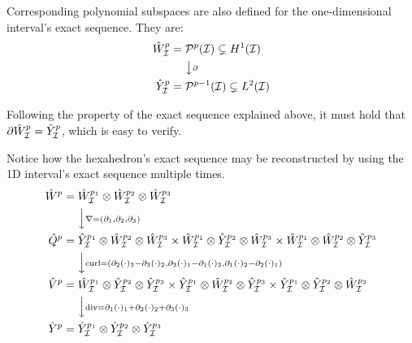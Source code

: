
Corresponding polynomial subspaces are also defined for the one-dimensional interval's exact sequence. They are:
% 
\begin{align*}
    \hat{W}^{p}_{\mathcal{I}}&=\mathcal{P}^p(\mathcal{I})\subsetneq H^1(\mathcal{I})\\
    \ &\ \ \ \ \big\downarrow  \scriptstyle{\partial}\\
    \hat{Y}^{p}_{\mathcal{I}}&=\mathcal{P}^{p-1}(\mathcal{I})\subsetneq L^2(\mathcal{I})
\end{align*}

Following the property of the exact sequence explained above, it must hold that $\partial\hat{W}^{p}_{\mathcal{I}}=\hat{Y}^{p}_{\mathcal{I}}$, which is easy to verify.

Notice how the hexahedron's exact sequence may be reconstructed by using the 1D interval's exact sequence multiple times.
% 
\begin{align*}
    \hat{W}^p &= \hat{W}^{p_1}_{\mcI}\otimes\hat{W}^{p_2}_{\mcI}\otimes\hat{W}^{p_3}_{\mcI}\\
    \ &\ \ \ \ \Big\downarrow  \scriptstyle{\nabla=(\partial_1,\partial_2,\partial_3)}\\
    \hat{Q}^p &=      \hat{Y}^{p_1}_{\mcI}\otimes\hat{W}^{p_2}_{\mcI}\otimes\hat{W}^{p_3}_{\mcI}
                \times\hat{W}^{p_1}_{\mcI}\otimes\hat{Y}^{p_2}_{\mcI}\otimes\hat{W}^{p_3}_{\mcI}
                \times\hat{W}^{p_1}_{\mcI}\otimes\hat{W}^{p_2}_{\mcI}\otimes\hat{Y}^{p_3}_{\mcI}\\
    \ &\ \ \ \ \Big\downarrow  \scriptstyle{\curl=(\partial_2(\cdot)_3-\partial_3(\cdot)_2,\partial_3(\cdot)_1-\partial_1(\cdot)_3,\partial_1(\cdot)_2-\partial_2(\cdot)_1)} \\
    \hat{V}^p &=      \hat{W}^{p_1}_{\mcI}\otimes\hat{Y}^{p_2}_{\mcI}\otimes\hat{Y}^{p_3}_{\mcI}
                \times\hat{Y}^{p_1}_{\mcI}\otimes\hat{W}^{p_2}_{\mcI}\otimes\hat{Y}^{p_3}_{\mcI}
                \times\hat{Y}^{p_1}_{\mcI}\otimes\hat{Y}^{p_2}_{\mcI}\otimes\hat{W}^{p_3}_{\mcI}\\
    \ &\ \ \ \ \Big\downarrow \scriptstyle{\div=\partial_1(\cdot)_1+\partial_2(\cdot)_2+\partial_3(\cdot)_3} \\
    \hat{Y}^p&=\hat{Y}^{p_1}_{\mcI}\otimes\hat{Y}^{p_2}_{\mcI}\otimes\hat{Y}^{p_3}_{\mcI}
\end{align*}


